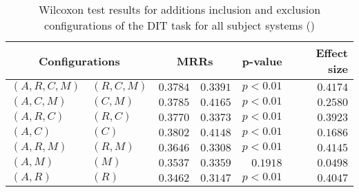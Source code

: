 
\begin{table}
\begin{spacing}{1.2}
\centering
\caption{Wilcoxon test results for additions inclusion and exclusion configurations of the DIT task for all subject systems (\ctwo)}
\label{table:versus-wilcox-all-dit-additions}
\begin{tabular}{ll|rr|rr}
\toprule
      \multicolumn{2}{c|}{Configurations} &                \multicolumn{2}{c|}{MRRs} &             p-value & Effect size \\
\midrule
 $(A,R,C,M)$ &  $(R,C,M)$ &  $\bm{0.3784}$ &       $0.3391$ & $p<0.01$ &    $0.4174$ \\
   $(A,C,M)$ &    $(C,M)$ &       $0.3785$ &  $\bm{0.4165}$ & $p<0.01$ &    $0.2580$ \\
   $(A,R,C)$ &    $(R,C)$ &  $\bm{0.3770}$ &       $0.3373$ & $p<0.01$ &    $0.3923$ \\
     $(A,C)$ &      $(C)$ &       $0.3802$ &  $\bm{0.4148}$ & $p<0.01$ &    $0.1686$ \\
   $(A,R,M)$ &    $(R,M)$ &  $\bm{0.3646}$ &       $0.3308$ & $p<0.01$ &    $0.4145$ \\
     $(A,M)$ &      $(M)$ &  $\bm{0.3537}$ &       $0.3359$ & $0.1918$ &    $0.0498$ \\
     $(A,R)$ &      $(R)$ &  $\bm{0.3462}$ &       $0.3147$ & $p<0.01$ &    $0.4047$ \\
\bottomrule
\end{tabular}

\end{spacing}
\end{table}

